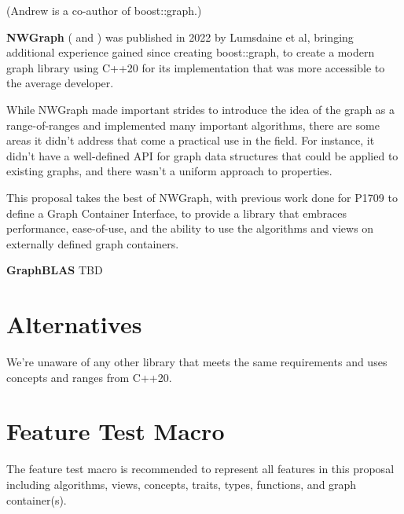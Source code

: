 (Andrew is a co-author of boost::graph.)

\medskip

\textbf{NWGraph} (\cite{REF_nwgraph_library} and \cite{REF_nwgraph_paper}) was published in 2022
by Lumsdaine et al, bringing additional experience gained since creating boost::graph, to create a modern graph library using C++20 for its implementation 
that was more accessible to the average developer. %

While NWGraph made important strides to introduce the idea of the graph as a range-of-ranges and implemented many important algorithms,
there are some areas it didn't address that come a practical use in the field. For instance, it didn't have a well-defined API for graph
data structures that could be applied to existing graphs, and there wasn't a uniform approach to properties.

This proposal takes the best of NWGraph, with previous work done for P1709 to define a Graph Container Interface, to provide a library that
embraces performance, ease-of-use, and the ability to use the algorithms and views on externally defined graph containers.

\medskip

\textbf{GraphBLAS} TBD

\section{Alternatives}
We're unaware of any other library that meets the same requirements and uses concepts and ranges from C++20.


\section{Feature Test Macro}
The  feature test macro is recommended to represent all features in this proposal including algorithms, views, concepts, traits, types, functions, and graph container(s).

